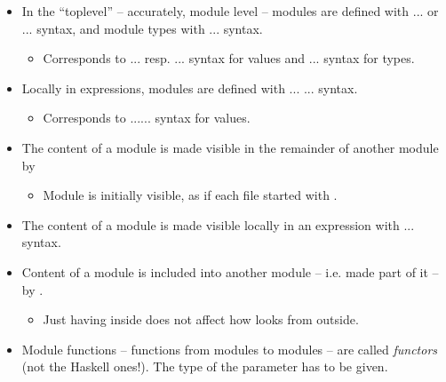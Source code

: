 \documentclass{beamer}
\newcommand{\tmem}[1]{{\em #1\/}}
\newcommand{\tmverbatim}[1]{\text{{\ttfamily{#1}}}}
\begin{document}
\begin{itemize}
  \item In the ``toplevel'' -- accurately, module level -- modules are defined
  with {}{}{\hlopt{=}} ... or {}{}{\hlopt{: }}{}{\hlopt{ =}} ...
  syntax, and module types with {}{}{\hlopt{=}} ... syntax.
  \begin{itemize}
    \item Corresponds to {}\tmverbatim{ v\_name }{\hlopt{=}} ...
    resp. {}\tmverbatim{ v\_name }{\hlopt{:}}{\hlstd{ v\_type
    }}{\hlopt{=}} ... syntax for values and {}{}{\hlopt{=}} ... syntax for types.
  \end{itemize}
  \item Locally in expressions, modules are defined with {}{}{\hlopt{= }}...{} ... syntax.
  \begin{itemize}
    \item Corresponds to {}\tmverbatim{ v\_name }{\hlopt{=
    }}...{}... syntax for values.
  \end{itemize}
  \item The content of a module is made visible in the remainder of another
  module by {}{}
  \begin{itemize}
    \item Module {} is initially visible, as if each file
    started with {}{}.
  \end{itemize}
  \item The content of a module is made visible locally in an expression with
  {}{}{}... syntax.
  
  \item Content of a module is included into another module -- i.e. made part
  of it -- by {}{}.
  \begin{itemize}
    \item Just having {}{} inside {}
    does not affect how {} looks from outside.
  \end{itemize}
  \item Module functions -- functions from modules to modules -- are called
  {\tmem{func{\nobreak}tors}} {\small{(not the Haskell ones!)}}. The type of
  the parameter has to be given.
  

\end{itemize}
\end{document}
